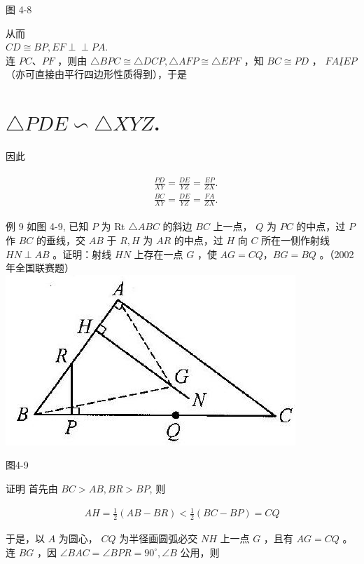 \documentclass[10pt]{article}
\def\Perp{\perp\!\!\!\perp}
\begin{document}
图 4-8

从而\\
$C D \cong B P, E F \Perp P A$.\\
连 $P C 、 P F$ ，则由 $\triangle B P C \cong \triangle D C P, \triangle A F P \cong \triangle E P F$ ，知 $B C \cong P D$ ， $F A \underline{I} E P$ （亦可直接由平行四边形性质得到），于是

\section*{$\triangle P D E \backsim \triangle X Y Z$.}
因此

\begin{align*}
\begin{aligned}
& \frac{P D}{X Y}=\frac{D E}{Y Z}=\frac{E P}{Z X} . \\
& \frac{B C}{X Y}=\frac{D E}{Y Z}=\frac{F A}{Z X} .
\end{aligned}
\end{align*}

例 9 如图 4-9, 已知 $P$ 为 Rt $\triangle A B C$ 的斜边 $B C$ 上一点， $Q$ 为 $P C$ 的中点，过 $P$ 作 $B C$ 的垂线，交 $A B$ 于 $R, H$ 为 $A R$ 的中点，过 $H$ 向 $C$ 所在一侧作射线 $H N \perp A B$ 。证明：射线 $H N$ 上存在一点 $G$ ，使 $A G=C Q ， B G=B Q$ 。（2002 年全国联赛题）\\
\includegraphics[max width=\textwidth, center]{2024_10_30_2c8f45efd4a519b08e1ag-041}

图4-9

证明 首先由 $B C>A B, B R>B P$, 则

\begin{align*}
A H=\frac{1}{2}(A B-B R)<\frac{1}{2}(B C-B P)=C Q
\end{align*}

于是，以 $A$ 为圆心， $C Q$ 为半径画圆弧必交 $N H$ 上一点 $G$ ，且有 $A G=C Q$ 。\\
连 $B G$ ，因 $\angle B A C=\angle B P R=90^{\circ}, \angle B$ 公用，则
\end{document}
